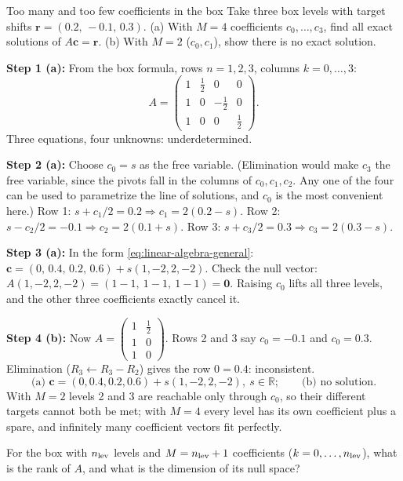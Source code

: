 \begin{sample}{Too many and too few coefficients in the box}
Take three box levels with target shifts $\bm r=(0.2,\,-0.1,\,0.3)$. (a) With $M=4$ coefficients $c_0,\dots,c_3$, find all exact solutions of $A\bm c=\bm r$. (b) With $M=2$ ($c_0,c_1$), show there is no exact solution.

\textbf{Step 1 (a):} From the box formula, rows $n=1,2,3$, columns $k=0,\dots,3$:
\[
A=\begin{pmatrix}1&\tfrac12&0&0\\ 1&0&-\tfrac12&0\\ 1&0&0&\tfrac12\end{pmatrix}.
\]
Three equations, four unknowns: underdetermined.

\textbf{Step 2 (a):} Choose $c_0=s$ as the free variable. (Elimination would make $c_3$ the free variable, since the pivots fall in the columns of $c_0,c_1,c_2$. Any one of the four can be used to parametrize the line of solutions, and $c_0$ is the most convenient here.) Row 1: $s+c_1/2=0.2\Rightarrow c_1=2(0.2-s)$. Row 2: $s-c_2/2=-0.1\Rightarrow c_2=2(0.1+s)$. Row 3: $s+c_3/2=0.3\Rightarrow c_3=2(0.3-s)$.

\textbf{Step 3 (a):} In the form \cref{eq:linear-algebra-general}: $\bm c=(0,\,0.4,\,0.2,\,0.6)+s(1,-2,2,-2)$. Check the null vector: $A(1,-2,2,-2)=(1-1,\ 1-1,\ 1-1)=\bm 0$. Raising $c_0$ lifts all three levels, and the other three coefficients exactly cancel it.

\textbf{Step 4 (b):} Now $A=\begin{pmatrix}1&\tfrac12\\1&0\\1&0\end{pmatrix}$. Rows 2 and 3 say $c_0=-0.1$ and $c_0=0.3$. Elimination ($R_3\leftarrow R_3-R_2$) gives the row $0=0.4$: inconsistent.
\[
\boxed{\text{(a) } \bm c=(0,0.4,0.2,0.6)+s(1,-2,2,-2),\ s\in\mathbb R;\qquad \text{(b) no solution.}}
\]
With $M=2$ levels 2 and 3 are reachable only through $c_0$, so their different targets cannot both be met; with $M=4$ every level has its own coefficient plus a spare, and infinitely many coefficient vectors fit perfectly.
\end{sample}

\begin{checkpoint}
For the box with $n_{\rm lev}$ levels and $M=n_{\rm lev}+1$ coefficients ($k=0,\dots,n_{\rm lev}$), what is the rank of $A$, and what is the dimension of its null space?
\end{checkpoint}

